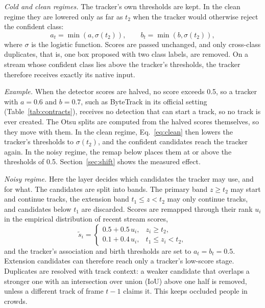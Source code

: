 \documentclass[pdflatex,sn-mathphys-num,iicol]{sn-jnl}
\begin{document}
\emph{Cold and clean regimes.} The tracker's own thresholds are kept. In the
clean regime they are lowered only as far as $t_2$ when the tracker would
otherwise reject the confident class:
\begin{equation}
a_t=\min\!\left(a,\sigma(t_2)\right),\qquad b_t=\min\!\left(b,\sigma(t_2)\right),
\label{eq:clean}
\end{equation}
where $\sigma$ is the logistic function. Scores are passed unchanged, and only
cross-class duplicates, that is, one box proposed with two class labels, are
removed. On a stream whose confident class lies above the tracker's
thresholds, the tracker therefore receives exactly its native input.

\emph{Example.} When the detector scores are halved, no score exceeds 0.5, so
a tracker with $a=0.6$ and $b=0.7$, such as ByteTrack in its official setting
(Table~\ref{tab:contracts}), receives no detection that can start a track,
so no track is ever created. The Otsu splits are computed from the halved scores themselves, so
they move with them. In the clean regime, Eq.~\eqref{eq:clean} then lowers
the tracker's thresholds to $\sigma(t_2)$, and the confident candidates reach
the tracker again. In the noisy regime, the remap below places them at or
above the thresholds of 0.5. Section~\ref{sec:shift} shows the measured effect.

\emph{Noisy regime.} Here the layer decides which candidates the tracker may
use, and for what. The candidates are split into bands. The primary band
$z\ge t_2$ may start and continue tracks, the extension band $t_1\le z<t_2$
may only continue tracks, and candidates below $t_1$ are discarded. Scores are
remapped through their rank $u_i$ in the empirical distribution of recent
stream scores,
\begin{equation}
\tilde{s}_i=
\begin{cases}
0.5+0.5\,u_i, & z_i\ge t_2,\\
0.1+0.4\,u_i, & t_1\le z_i<t_2,
\end{cases}
\label{eq:remap}
\end{equation}
and the tracker's association and birth thresholds are set to
$a_t=b_t=0.5$. Extension candidates can therefore reach only a tracker's
low-score stage. Duplicates are resolved with track context: a weaker
candidate that overlaps a stronger one with an intersection over union (IoU)
above one half is removed, unless a different track of frame $t-1$ claims it.
This keeps occluded people in crowds.
\end{document}
